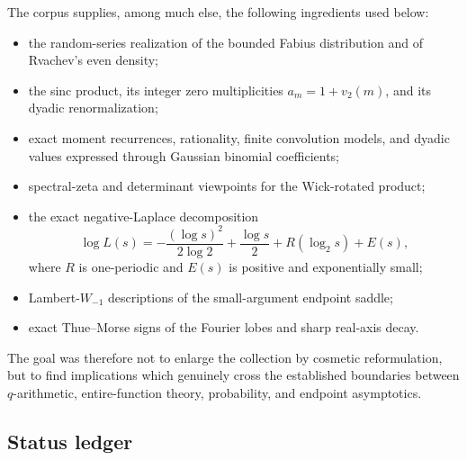 \documentclass[11pt]{article}
\numberwithin{equation}{section}
\theoremstyle{definition}
\theoremstyle{remark}
\begin{document}
The corpus supplies, among much else, the following ingredients used below:
\begin{itemize}
\item the random-series realization of the bounded Fabius distribution and of
      Rvachev's even density;
\item the sinc product, its integer zero multiplicities
      $a_m=1+v_2(m)$, and its dyadic renormalization;
\item exact moment recurrences, rationality, finite convolution models, and
      dyadic values expressed through Gaussian binomial coefficients;
\item spectral-zeta and determinant viewpoints for the Wick-rotated product;
\item the exact negative-Laplace decomposition
      \[
      \log L(s)=-\frac{(\log s)^2}{2\log2}+\frac{\log s}{2}
        +R(\log_2s)+E(s),
      \]
      where $R$ is one-periodic and $E(s)$ is positive and exponentially
      small;
\item Lambert-$W_{-1}$ descriptions of the small-argument endpoint saddle;
\item exact Thue--Morse signs of the Fourier lobes and sharp real-axis decay.
\end{itemize}
The goal was therefore not to enlarge the collection by cosmetic reformulation,
but to find implications which genuinely cross the established boundaries
between $q$-arithmetic, entire-function theory, probability, and endpoint
asymptotics.

\subsection{Status ledger}
\end{document}
